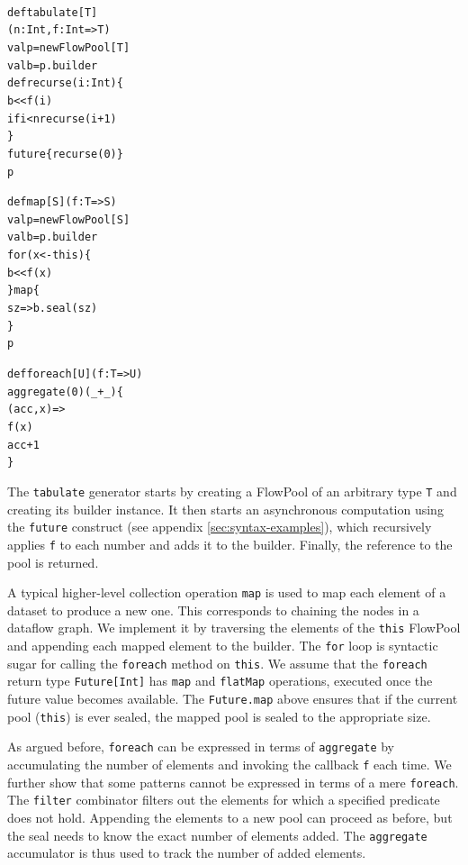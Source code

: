 \documentclass[runningheads,a4paper]{llncs}
\begin{document}
\noindent
\begin{minipage}[b]{4.2 cm}
\begin{alltt}
{\scriptsize
def tabulate[T]
  (n: Int, f: Int => T)
  val p = new FlowPool[T]
  val b = p.builder
  def recurse(i: Int) \{
    b << f(i)
    if i < n recurse(i + 1)
  \}
  future \{ recurse(0) \}
  p
}
\end{alltt}
\end{minipage}\begin{minipage}[b]{4 cm}
\begin{alltt}
{\scriptsize
def map[S](f: T => S)
  val p = new FlowPool[S]
  val b = p.builder
  for (x <- this) \{
    b << f(x)
  \} map \{
    sz => b.seal(sz)
  \}
  p

}
\end{alltt}
\end{minipage}
\begin{minipage}[b]{2.5 cm}
\begin{alltt}
{\scriptsize
def foreach[U](f: T => U)
  aggregate(0)(_ + _) \{
    (acc, x) =>
    f(x)
    acc + 1
  \}




}
\end{alltt}
\end{minipage}

The \verb=tabulate= generator starts by creating a FlowPool of an
arbitrary type \verb=T= and creating its builder instance.
It then starts an asynchronous computation using the \verb=future=
construct (see appendix \ref{sec:syntax-examples}), which recursively applies \verb=f= to each number and
adds it to the builder.
Finally, the reference to the pool is returned.

A typical higher-level collection operation \verb=map= is used to
map each element of a dataset to produce a new one.
This corresponds to chaining the nodes in a dataflow graph.
We implement it by traversing the elements of the \verb=this= FlowPool
and
appending each mapped element to the builder.
The \verb=for= loop is syntactic sugar for calling the
\verb=foreach= method on \verb=this=.
We assume that the \verb=foreach= return type \verb=Future[Int]=
has \verb=map= and \verb=flatMap= operations, executed
once the future value becomes available.
The \verb=Future.map= above ensures that if the current pool (\verb=this=) is ever
sealed, the mapped pool is sealed to the appropriate size.

As argued before, \verb=foreach= can be expressed in terms of
\verb=aggregate= by accumulating the number of elements and invoking the
callback \verb=f= each time.
We further show that some patterns cannot be expressed in terms of a mere
\verb=foreach=.
The \verb=filter= combinator filters out the elements for which a
specified predicate does not hold.
Appending the elements to a new pool can proceed as
before, but the seal needs to know the exact number of elements added.
The \verb=aggregate= accumulator is thus used to track the number
of added elements.
\end{document}
